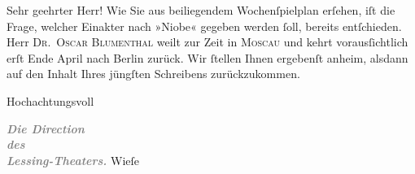 \pstart\center{}Sehr geehrter Herr!\pend\vspace{0.5em}
\pstart
           Wie Sie aus beiliegendem Wochenſpielplan erſehen, iſt die Frage, welcher Einakter nach »Niobe« gegeben werden{ }ſoll, bereits entſchieden.
               Herr \textsc{Dr. Oscar Blumenthal} weilt zur Zeit in \textsc{Moscau} und kehrt vorausſichtlich erſt Ende April nach Berlin zurück. Wir{ }ſtellen Ihnen ergebenſt anheim, alsdann auf
               den Inhalt Ihres jüngſten Schreibens zurückzukommen.\pend
           
\pstart
           Hochachtungsvoll\pend
           
\pstart
           \raggedleft{}\textcolor{gray}{\textbf{\textit{Die Direction}}}{\\}\textcolor{gray}{\textbf{\textit{des}}}{\\}\textcolor{gray}{\textbf{\textit{Lessing-Theaters.}}}\pend
           \pstart \spacefill\mbox{Wieſe}\pend{}\endnumbering{}  \newcommand{\dateiname}{L00307}\newcommand{\titel}{Gerhard Wiese an Arthur Schnitzler, 21. 3. 1894}\newcommand{\editorInnen}{Martin Anton Müller und Gerd-Hermann Susen}
